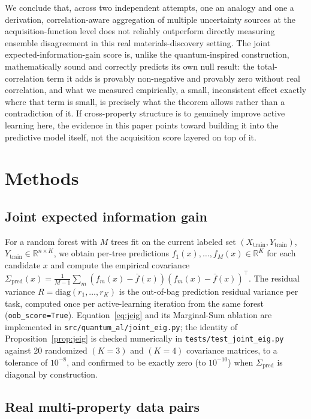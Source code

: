 \documentclass[10pt]{article}
\begin{document}
We conclude that, across two independent attempts, one an analogy and one a derivation, correlation-aware aggregation of multiple uncertainty sources at the acquisition-function level does not reliably outperform directly measuring ensemble disagreement in this real materials-discovery setting. The joint expected-information-gain score is, unlike the quantum-inspired construction, mathematically sound and correctly predicts its own null result: the total-correlation term it adds is provably non-negative and provably zero without real correlation, and what we measured empirically, a small, inconsistent effect exactly where that term is small, is precisely what the theorem allows rather than a contradiction of it. If cross-property structure is to genuinely improve active learning here, the evidence in this paper points toward building it into the predictive model itself, not the acquisition score layered on top of it.

\section{Methods}\label{sec:methods}

\subsection{Joint expected information gain}\label{sec:methods-jeig}

For a random forest with $M$ trees fit on the current labeled set $(X_{\mathrm{train}}, Y_{\mathrm{train}})$, $Y_{\mathrm{train}}\in\mathbb{R}^{n\times K}$, we obtain per-tree predictions $f_1(x),\ldots,f_M(x)\in\mathbb{R}^K$ for each candidate $x$ and compute the empirical covariance $\Sigma_{\mathrm{pred}}(x) = \frac{1}{M-1}\sum_{m}(f_m(x)-\bar f(x))(f_m(x)-\bar f(x))^\top$. The residual variance $R=\mathrm{diag}(r_1,\ldots,r_K)$ is the out-of-bag prediction residual variance per task, computed once per active-learning iteration from the same forest (\texttt{oob\_score=True}). Equation~\ref{eq:jeig} and its Marginal-Sum ablation are implemented in \texttt{src/quantum\_al/joint\_eig.py}; the identity of Proposition~\ref{prop:jeig} is checked numerically in \texttt{tests/test\_joint\_eig.py} against 20 randomized $(K{=}3)$ and $(K{=}4)$ covariance matrices, to a tolerance of $10^{-8}$, and confirmed to be exactly zero (to $10^{-10}$) when $\Sigma_{\mathrm{pred}}$ is diagonal by construction.

\subsection{Real multi-property data pairs}\label{sec:methods-pairs}
\end{document}
